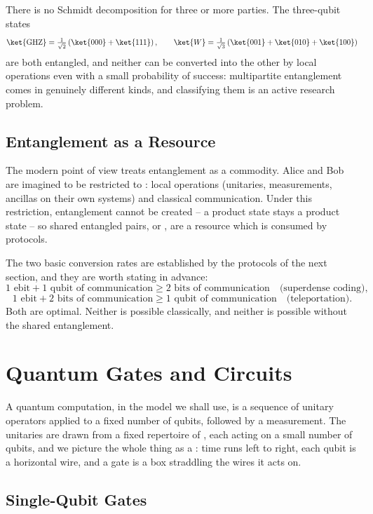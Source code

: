 \begin{remark}
	There is no Schmidt decomposition for three or more parties. The three-qubit states
	$$\ket{\mathrm{GHZ}} = \tfrac1{\sqrt2}\left(\ket{000}+\ket{111}\right), \qquad \ket{W} = \tfrac1{\sqrt3}\left(\ket{001}+\ket{010}+\ket{100}\right)$$
	are both entangled, and neither can be converted into the other by local operations even with a small probability of success: multipartite entanglement comes in genuinely different kinds, and classifying them is an active research problem.
\end{remark}

\subsection{Entanglement as a Resource}

The modern point of view treats entanglement as a commodity. Alice and Bob are imagined to be restricted to : local operations (unitaries, measurements, ancillas on their own systems) and classical communication. Under this restriction, entanglement cannot be created -- a product state stays a product state -- so shared entangled pairs, or , are a resource which is consumed by protocols.

The two basic conversion rates are established by the protocols of the next section, and they are worth stating in advance:
$$1 \text{ ebit} + 1 \text{ qubit of communication} \geq 2 \text{ bits of communication}\quad \text{(superdense coding)},$$
$$1 \text{ ebit} + 2 \text{ bits of communication} \geq 1 \text{ qubit of communication} \quad \text{(teleportation)}.$$
Both are optimal. Neither is possible classically, and neither is possible without the shared entanglement.

\section{Quantum Gates and Circuits}\label{sec:gates}

A quantum computation, in the model we shall use, is a sequence of unitary operators applied to a fixed number of qubits, followed by a measurement. The unitaries are drawn from a fixed repertoire of , each acting on a small number of qubits, and we picture the whole thing as a : time runs left to right, each qubit is a horizontal wire, and a gate is a box straddling the wires it acts on.

\subsection{Single-Qubit Gates}

